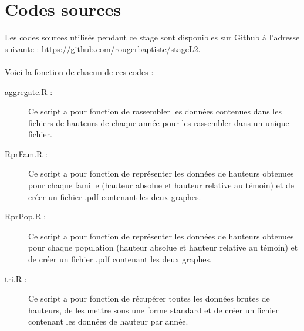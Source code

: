 \documentclass[12pt,a4paper]{report}
\begin{document}
	\chapter{Codes sources}
	Les codes sources utilisés pendant ce stage sont disponibles sur Github à l'adresse suivante : \url{https://github.com/rougerbaptiste/stageL2}.\\~\\
	Voici la fonction de chacun de ces codes :
	\begin{description}
		\item [aggregate.R :] Ce script a pour fonction de rassembler les données contenues dans les fichiers de hauteurs de chaque année pour les rassembler dans un unique fichier.
		\item [RprFam.R :] Ce script a pour fonction de représenter les données de hauteurs obtenues pour chaque famille (hauteur absolue et hauteur relative au témoin) et de créer un fichier .pdf contenant les deux graphes.
		\item [RprPop.R :] Ce script a pour fonction de représenter les données de hauteurs obtenues pour chaque population (hauteur absolue et hauteur relative au témoin) et de créer un fichier .pdf contenant les deux graphes.
		\item [tri.R :] Ce script a pour fonction de récupérer toutes les données brutes de hauteurs, de les mettre sous une forme standard et de créer un fichier contenant les données de hauteur par année.
		
	\end{description}
\end{document}
